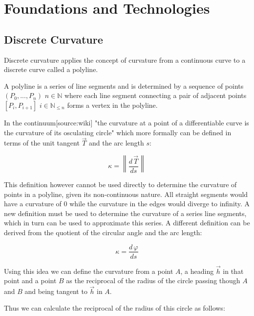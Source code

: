 

\graphicspath{{Chapter/Figs/basics/}}
\chapter{Foundations and Technologies}
\label{chap:basics}

\section{Discrete Curvature}
Discrete curvature applies the concept of curvature from a continuous curve to a discrete curve called a polyline.

\vskip 0.2in

A polyline is a series of line segments and is determined by a sequence of points $(P_0,...,P_n)$ $n \in \mathbb{N}$ where each line segment connecting a pair of adjacent points $[P_i,P_{i+1}]$ $i \in \mathbb{N}_{\le n}$ forms a vertex in the polyline.

\vskip 0.2in

In the continuum[source:wiki] "the curvature at a point of a differentiable curve is the curvature of its osculating circle"  which more formally can be defined in terms of the unit tangent $\vec T$ and the arc length $s$: \citep{CurvatureDefinition} \citep{Aup91}

$$\kappa  = \left\| {\frac{{d\,\vec T}}{{ds}}} \right\|$$

This definition however cannot be used directly to determine the curvature of points in a polyline, given its non-continuous nature. All straight segments would have a curvature of $0$ while the curvature in the edges would diverge to infinity. A new definition must be used to determine the curvature of a series line segments, which in turn can be used to approximate this series. A different definition can be derived from the quotient of the circular angle and the arc length:

$$\kappa  =  {\frac{{d\,\varphi}}{{ds}}}$$

Using this idea we can define the curvature from a point $A$, a heading  $\vec h$ in that point and a point $B$ as the reciprocal of the radius of the circle passing though $A$ and $B$ and being tangent to  $\vec h$ in $A$.


Thus we can calculate the reciprocal of the radius of this circle as follows:

